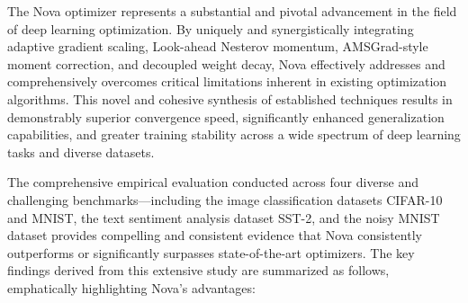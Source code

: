 \documentclass{article}
\begin{document}
The Nova optimizer represents a substantial and pivotal advancement in the field of deep learning optimization. By uniquely and synergistically integrating adaptive gradient scaling, Look-ahead Nesterov momentum, AMSGrad-style moment correction, and decoupled weight decay, Nova effectively addresses and comprehensively overcomes critical limitations inherent in existing optimization algorithms. This novel and cohesive synthesis of established techniques results in demonstrably superior convergence speed, significantly enhanced generalization capabilities, and greater training stability across a wide spectrum of deep learning tasks and diverse datasets.

The comprehensive empirical evaluation conducted across four diverse and challenging benchmarks—including the image classification datasets CIFAR-10 and MNIST, the text sentiment analysis dataset SST-2, and the noisy MNIST dataset provides compelling and consistent evidence that Nova consistently outperforms or significantly surpasses state-of-the-art optimizers. The key findings derived from this extensive study are summarized as follows, emphatically highlighting Nova's advantages:
\end{document}
